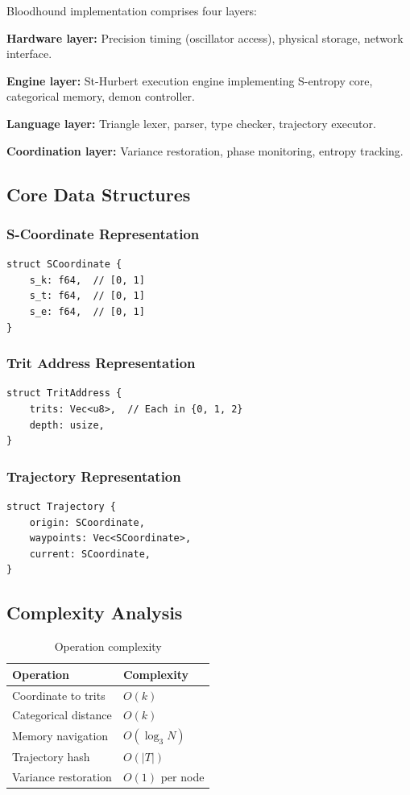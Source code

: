 \documentclass[10pt,twocolumn]{article}
\theoremstyle{definition}
\theoremstyle{remark}
\begin{document}
Bloodhound implementation comprises four layers:

\textbf{Hardware layer:} Precision timing (oscillator access), physical storage, network interface.

\textbf{Engine layer:} St-Hurbert execution engine implementing S-entropy core, categorical memory, demon controller.

\textbf{Language layer:} Triangle lexer, parser, type checker, trajectory executor.

\textbf{Coordination layer:} Variance restoration, phase monitoring, entropy tracking.

\subsection{Core Data Structures}

\subsubsection{S-Coordinate Representation}

\begin{verbatim}
struct SCoordinate {
    s_k: f64,  // [0, 1]
    s_t: f64,  // [0, 1]
    s_e: f64,  // [0, 1]
}
\end{verbatim}

\subsubsection{Trit Address Representation}

\begin{verbatim}
struct TritAddress {
    trits: Vec<u8>,  // Each in {0, 1, 2}
    depth: usize,
}
\end{verbatim}

\subsubsection{Trajectory Representation}

\begin{verbatim}
struct Trajectory {
    origin: SCoordinate,
    waypoints: Vec<SCoordinate>,
    current: SCoordinate,
}
\end{verbatim}

\subsection{Complexity Analysis}

\begin{table}[h]
\centering
\caption{Operation complexity}
\begin{tabular}{@{}ll@{}}
\toprule
Operation & Complexity \\
\midrule
Coordinate to trits & $O(k)$ \\
Categorical distance & $O(k)$ \\
Memory navigation & $O(\log_3 N)$ \\
Trajectory hash & $O(|T|)$ \\
Variance restoration & $O(1)$ per node \\
\bottomrule
\end{tabular}
\end{table}
\end{document}

